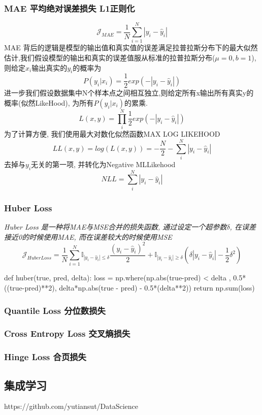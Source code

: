 \documentclass{scrartcl}
\numberwithin{equation}{section}   %
\begin{document}
\subsubsection{MAE 平均绝对误差损失 L1正则化}
$$\mathcal{J}_{MAE} =\frac{1}{N}\sum_{i=1}^N{\left\lvert y_i - \hat{y}_i\right\rvert } $$MAE 背后的逻辑是模型的输出值和真实值的误差满足拉普拉斯分布下的最大似然估计,我们假设模型的输出和真实的误差值服从标准的拉普拉斯分布($\mu=0, b=1$),则给定$x_i$输出真实的$y_i$的概率为$$P(y_i\vert x_i) = \frac{1}{2}exp(- \left\lvert y_i -  \hat{y}_i\right\rvert)$$进一步我们假设数据集中N个样本点之间相互独立,则给定所有x输出所有真实y的概率(似然LikeHood), 为所有$P(y_i\vert x_i)$的累乘. $$L(x,y) = \prod_i^N   \frac{1}{2}exp(- \left\lvert y_i -  \hat{y}_i\right\rvert)$$为了计算方便, 我们使用最大对数化似然函数MAX LOG LIKEHOOD$$LL(x,y) =  log(L(x,y)) = -\frac{N}{2} -\sum_i^N\left\lvert y_i - \hat{y}_i\right\rvert $$去掉与$y_i$无关的第一项, 并转化为Negative MLLikehood $$NLL=\sum_i^N\left\lvert y_i - \hat{y}_i\right\rvert $$
\subsubsection{Huber Loss}
\textsl{Huber Loss 是一种将MAE与MSE合并的损失函数, 通过设定一个超参数$\delta$, 在误差接近0的时候使用MAE, 而在误差较大的时候使用MSE $$\mathcal{J}_{Huber Loss} =\frac{1}{N}\sum_{i=1}^N \mathbb{I}_{\left\lvert y_i - \hat{y}_i\right\rvert \leq \delta} \frac{(y_i - \hat{y}_i)^2}{2} +\mathbb{I}_{\left\lvert y_i - \hat{y}_i\right\rvert \geq  \delta} (\delta \left\lvert y_i - \hat{y}_i\right\rvert -\frac{1}{2}\delta^2)$$}
\begin{python}
    def huber(true, pred, delta):
        loss = np.where(np.abs(true-pred) < delta , 0.5*((true-pred)**2), delta*np.abs(true - pred) - 0.5*(delta**2))
        return np.sum(loss)
\end{python}
\subsubsection{Quantile Loss 分位数损失}
\subsubsection{Cross Entropy Loss 交叉熵损失}
\subsubsection{Hinge Loss  合页损失}
\subsection{集成学习}
https://github.com/yutiansut/DataScience
\end{document}
